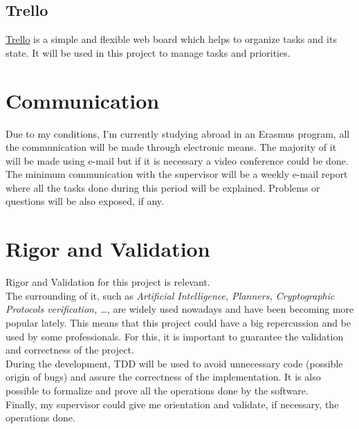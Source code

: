 \subsection{Trello}
\href{https://trello.com}{Trello} is a simple and flexible web board which helps to organize tasks and its state. It will be used in this project to manage tasks and priorities.  

\section{Communication}
Due to my conditions, I'm currently studying abroad in an Erasmus program, all the communication will be made through electronic means. The majority of it will be made using e-mail but if it is necessary a video conference could be done. \\
The minimum communication with the supervisor will be a weekly e-mail report where all the tasks done during this period will be explained. Problems or questions will be also exposed, if any.

\section{Rigor and Validation}
Rigor and Validation for this project is relevant. \\
The surrounding of it, such as \emph{Artificial Intelligence, Planners, Cryptographic Protocols verification, \ldots}, are widely used nowadays and have been becoming more popular lately. This means that this project could have a big repercussion and be used by some professionals. For this, it is important to guarantee the validation and correctness of the project. \\
During the development, TDD will be used to avoid unnecessary code (possible origin of bugs) and assure the correctness of the implementation. It is also possible to formalize and prove all the operations done by the software.\\
Finally, my supervisor could give me orientation and validate, if necessary, the operations done.